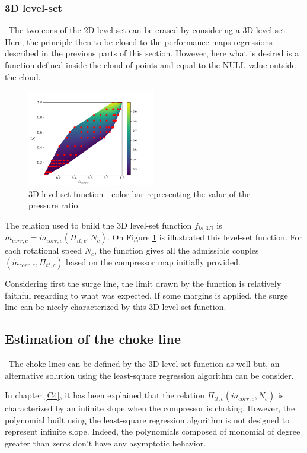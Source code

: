 \subsubsection{3D level-set}
\quad\ The two cons of the 2D level-set can be erased by considering a 3D level-set. Here, the principle then to be closed to the performance maps regressions described in the previous parts of this section. However, here what is desired is a function defined inside the cloud of points and equal to the NULL value outside the cloud. 


\begin{figure}[H]
    \centering
    \includegraphics[width=0.5\textwidth]{Comp_map/3D_LS.png}
    \caption{3D level-set function - color bar representing the value of the pressure ratio.}
    \label{fig:C7_LS3D}
\end{figure}
The relation used to build the 3D level-set function $f_{ls,3D}$ is $\dot{m}_{corr,c} = \dot{m}_{corr,c}(\Pi_{tt,c},N_c)$. On Figure \ref{fig:C7_LS3D} is illustrated this level-set function. 
For each rotational speed $N_c$, the function gives all the admissible couples $(\dot{m}_{corr,c},\Pi_{tt,c})$ based on the compressor map initially provided. 

Considering first the surge line, the limit drawn by the function is relatively faithful regarding to what was expected. If some margins is applied, the surge line can be nicely characterized by this 3D level-set function. 

\subsection{Estimation of the choke line}
\quad\ The choke lines can be defined by the 3D level-set function as well but, an alternative solution using the least-square regression algorithm can be consider.


In chapter \ref{C4}, it has been explained that the relation $\Pi_{tt,c}(\dot{m}_{corr,c},N_c)$ is characterized by an infinite slope when the compressor is choking. However, the polynomial built using the least-square regression algorithm is not designed to represent infinite slope. Indeed, the polynomials composed of monomial of degree greater than zeros don't have any asymptotic behavior.

